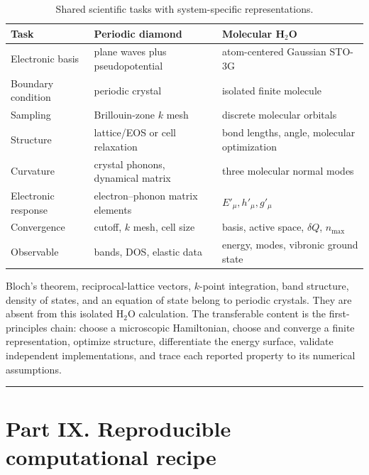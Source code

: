 \documentclass[10pt,twocolumn]{article}
\newcommand{\conceptbreak}{%
  \par\medskip\noindent
  {\color{black!30}\rule{\columnwidth}{0.35pt}}%
  \par\medskip}
\begin{document}
\begin{table}[ht]
\centering
\caption{Shared scientific tasks with system-specific representations.}
{\scriptsize
\begin{tabular}{@{}p{}p{}p{}@{}}
\toprule
Task & Periodic diamond & Molecular H$_2$O\\\midrule
Electronic basis & plane waves plus pseudopotential & atom-centered Gaussian STO-3G\\
Boundary condition & periodic crystal & isolated finite molecule\\
Sampling & Brillouin-zone $k$ mesh & discrete molecular orbitals\\
Structure & lattice/EOS or cell relaxation & bond lengths, angle, molecular optimization\\
Curvature & crystal phonons, dynamical matrix & three molecular normal modes\\
Electronic response & electron--phonon matrix elements & $E'_\mu,h'_\mu,g'_\mu$\\
Convergence & cutoff, $k$ mesh, cell size & basis, active space, $\delta Q$, $n_{\max}$\\
Observable & bands, DOS, elastic data & energy, modes, vibronic ground state\\
\bottomrule
\end{tabular}}
\label{tab:diamond-water}
\end{table}

Bloch's theorem, reciprocal-lattice vectors, $k$-point integration, band
structure, density of states, and an equation of state belong to periodic
crystals.  They are absent from this isolated H$_2$O calculation.  The
transferable content is the first-principles chain: choose a microscopic
Hamiltonian, choose and converge a finite representation, optimize structure,
differentiate the energy surface, validate independent implementations, and
trace each reported property to its numerical assumptions.

\conceptbreak

\section*{Part IX. Reproducible computational recipe}
\end{document}
